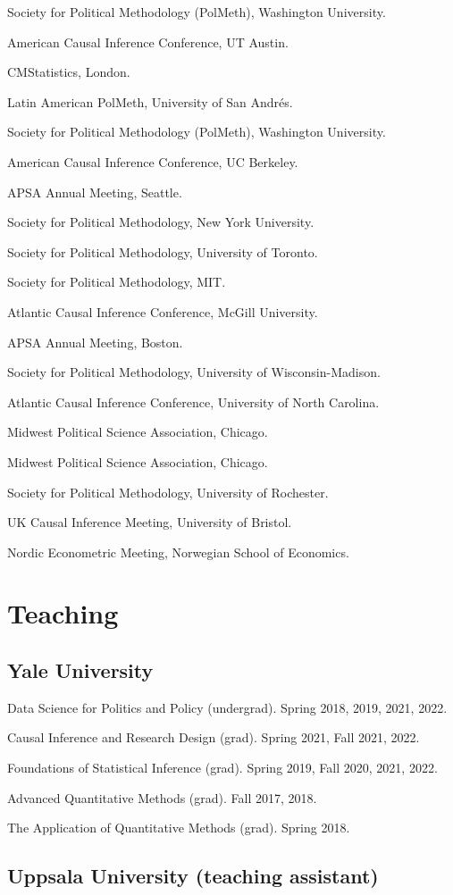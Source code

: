 \documentclass[10pt,letterpaper]{article}
\newenvironment{singledatelist}{
	\begin{list}{}{
		\setlength{\parskip}{0pt}
		\setlength{\itemsep}{4pt}
		\setlength{\parsep}{0.3em}
		\setlength{\leftmargin}{3.5em}
		\setlength{\labelwidth}{3.5em}
		\setlength{\labelsep}{1.5em}
		}
	}{
\end{list}
}
\newcommand{\dateitem}[2][]{\item[{#1}] {#2}}
\newenvironment{infolist}{
	\begin{list}{}{
		\setlength{\parskip}{0pt}
		\setlength{\itemsep}{4pt}
		\setlength{\parsep}{0.3em}
		\setlength{\leftmargin}{0em}
		\setlength{\labelwidth}{0em}
		}
	}{
\end{list}
}
\newcommand{\infoitem}[1]{\item {#1}}
\begin{document}
	\begin{singledatelist}
		\dateitem[2023]{Society for Political Methodology (PolMeth), Washington University.}
		\dateitem{American Causal Inference Conference, UT Austin.}
		\dateitem[2022]{CMStatistics, London.}
		\dateitem{Latin American PolMeth, University of San Andrés.}
		\dateitem{Society for Political Methodology (PolMeth), Washington University.}
		\dateitem{American Causal Inference Conference, UC Berkeley.}
		\dateitem[2021]{APSA Annual Meeting, Seattle.}
		\dateitem{Society for Political Methodology, New York University.}
		\dateitem[2020]{Society for Political Methodology, University of Toronto.}
		\dateitem[2019]{Society for Political Methodology, MIT.}
		\dateitem{Atlantic Causal Inference Conference, McGill University.}
		\dateitem[2018]{APSA Annual Meeting, Boston.}
		\dateitem[2017]{Society for Political Methodology, University of Wisconsin-Madison.}
		\dateitem{Atlantic Causal Inference Conference, University of North Carolina.}
		\dateitem{Midwest Political Science Association, Chicago.}
		\dateitem[2016]{Midwest Political Science Association, Chicago.}
		\dateitem[2015]{Society for Political Methodology, University of Rochester.}
		\dateitem{UK Causal Inference Meeting, University of Bristol.}
		\dateitem[2013]{Nordic Econometric Meeting, Norwegian School of Economics.}
	\end{singledatelist}


	\section*{Teaching}

	\subsection*{Yale University}

	\begin{infolist}
		\infoitem{Data Science for Politics and Policy (undergrad). Spring 2018, 2019, 2021, 2022.}
		\infoitem{Causal Inference and Research Design (grad). Spring 2021, Fall 2021, 2022.}
		\infoitem{Foundations of Statistical Inference (grad). Spring 2019, Fall 2020, 2021, 2022.}
		\infoitem{Advanced Quantitative Methods (grad). Fall 2017, 2018.}
		\infoitem{The Application of Quantitative Methods (grad). Spring 2018.}
	\end{infolist}

	\subsection*{Uppsala University (teaching assistant)}
\end{document}
